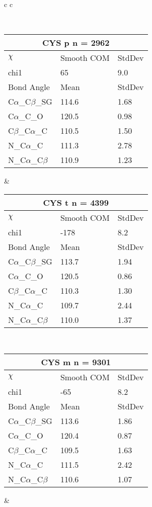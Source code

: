 \newpage

\begin{longtable}{ c c }

\caption{CYS Central Values}\\
  \begin{tabular}{ l l l }
  \toprule
  \multicolumn{3}{c}{CYS \textbf{p} n = 2962} \\ \toprule
  $\chi$       & Smooth COM & StdDev \\ \midrule
  chi1 & 65 & 9.0 \\ \midrule
  Bond Angle   & Mean     & StdDev \\ \midrule
  C$\alpha$\_C$\beta$\_SG & 114.6 & 1.68\\
  C$\alpha$\_C\_O & 120.5 & 0.98\\
  C$\beta$\_C$\alpha$\_C & 110.5 & 1.50\\
  N\_C$\alpha$\_C & 111.3 & 2.78\\
  N\_C$\alpha$\_C$\beta$ & 110.9 & 1.23\\
  \bottomrule
  \end{tabular}
  &
  \begin{tabular}{ l l l }
  \toprule
  \multicolumn{3}{c}{CYS \textbf{t} n = 4399} \\ \toprule
  $\chi$       & Smooth COM & StdDev \\ \midrule
  chi1 & -178 & 8.2 \\ \midrule
  Bond Angle   & Mean     & StdDev \\ \midrule
  C$\alpha$\_C$\beta$\_SG & 113.7 & 1.94\\
  C$\alpha$\_C\_O & 120.5 & 0.86\\
  C$\beta$\_C$\alpha$\_C & 110.3 & 1.30\\
  N\_C$\alpha$\_C & 109.7 & 2.44\\
  N\_C$\alpha$\_C$\beta$ & 110.0 & 1.37\\
  \bottomrule
  \end{tabular}
  \\
  \begin{tabular}{ l l l }
  \toprule
  \multicolumn{3}{c}{CYS \textbf{m} n = 9301} \\ \toprule
  $\chi$       & Smooth COM & StdDev \\ \midrule
  chi1 & -65 & 8.2 \\ \midrule
  Bond Angle   & Mean     & StdDev \\ \midrule
  C$\alpha$\_C$\beta$\_SG & 113.6 & 1.86\\
  C$\alpha$\_C\_O & 120.4 & 0.87\\
  C$\beta$\_C$\alpha$\_C & 109.5 & 1.63\\
  N\_C$\alpha$\_C & 111.5 & 2.42\\
  N\_C$\alpha$\_C$\beta$ & 110.6 & 1.07\\
  \bottomrule
  \end{tabular}
  &
  \\
  
\end{longtable}

